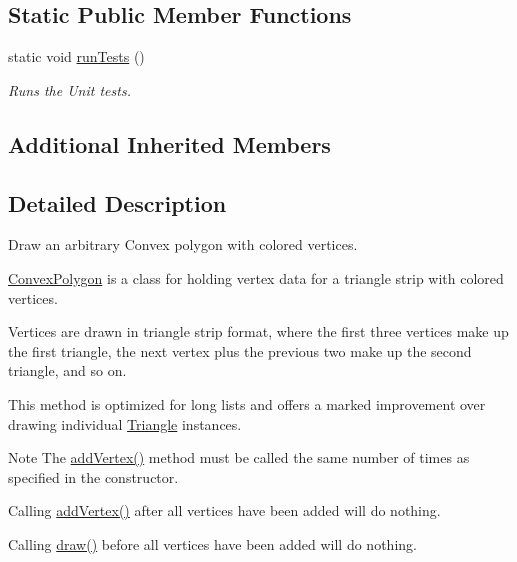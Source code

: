 \subsection*{Static Public Member Functions}
\begin{DoxyCompactItemize}
\item 
static void \hyperlink{classtsgl_1_1_convex_polygon_ac309bc2b2f142b0a02b9dc38e901daeb}{run\-Tests} ()
\begin{DoxyCompactList}\small\item\em Runs the Unit tests. \end{DoxyCompactList}\end{DoxyCompactItemize}
\subsection*{Additional Inherited Members}


\subsection{Detailed Description}
Draw an arbitrary Convex polygon with colored vertices. 

\hyperlink{classtsgl_1_1_convex_polygon}{Convex\-Polygon} is a class for holding vertex data for a triangle strip with colored vertices.

Vertices are drawn in triangle strip format, where the first three vertices make up the first triangle, the next vertex plus the previous two make up the second triangle, and so on.

This method is optimized for long lists and offers a marked improvement over drawing individual \hyperlink{classtsgl_1_1_triangle}{Triangle} instances. \begin{DoxyNote}{Note}
The \hyperlink{classtsgl_1_1_convex_polygon_a60d17a5ac80a796d05dfeff855791cc0}{add\-Vertex()} method must be called the same number of times as specified in the constructor. 

Calling \hyperlink{classtsgl_1_1_convex_polygon_a60d17a5ac80a796d05dfeff855791cc0}{add\-Vertex()} after all vertices have been added will do nothing. 

Calling \hyperlink{classtsgl_1_1_convex_polygon_add4d4971a5d22385eebbfe771af916b5}{draw()} before all vertices have been added will do nothing. 
\end{DoxyNote}


